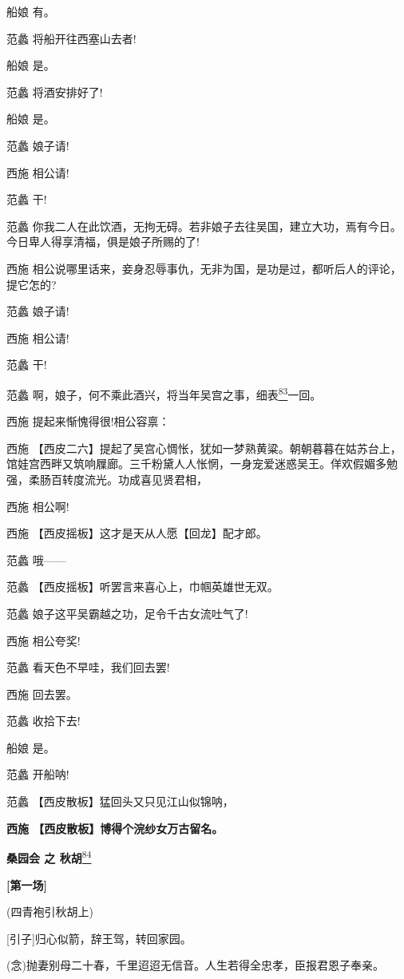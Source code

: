 船娘 有。

范蠡 将船开往西塞山去者!

船娘 是。

范蠡 将酒安排好了!

船娘 是。

范蠡 娘子请!

西施 相公请!

范蠡 干!

范蠡
你我二人在此饮酒，无拘无碍。若非娘子去往吴国，建立大功，焉有今日。今日卑人得享清福，俱是娘子所赐的了!

西施
相公说哪里话来，妾身忍辱事仇，无非为国，是功是过，都听后人的评论，提它怎的?

范蠡 娘子请!

西施 相公请!

范蠡 干!

范蠡
啊，娘子，何不乘此酒兴，将当年吴宫之事，细表\protect\hyperlink{fn83}{\textsuperscript{83}}一回。

西施 提起来惭愧得很!相公容禀：

西施
【西皮二六】提起了吴宫心惆怅，犹如一梦熟黄粱。朝朝暮暮在姑苏台上，馆娃宫西畔又筑响屧廊。三千粉黛人人怅惘，一身宠爱迷惑吴王。佯欢假媚多勉强，柔肠百转度流光。功成喜见贤君相，

西施 相公啊!

西施 【西皮摇板】这才是天从人愿【回龙】配才郎。

范蠡 哦------

范蠡 【西皮摇板】听罢言来喜心上，巾帼英雄世无双。

范蠡 娘子这平吴霸越之功，足令千古女流吐气了!

西施 相公夸奖!

范蠡 看天色不早哇，我们回去罢!

西施 回去罢。

范蠡 收拾下去!

船娘 是。

范蠡 开船呐!

范蠡 【西皮散板】猛回头又只见江山似锦呐，

\textbf{西施 【西皮散板】博得个浣纱女万古留名。}

\textbf{桑园会 之 秋胡}\protect\hyperlink{fn84}{\textsuperscript{84}}

\textbf{{[}第一场{]}}

(四青袍引秋胡上)

{[}引子{]}归心似箭，辞王驾，转回家园。

(念)抛妻别母二十春，千里迢迢无信音。人生若得全忠孝，臣报君恩子奉亲。

